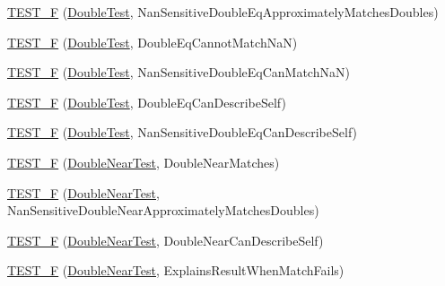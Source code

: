 \begin{DoxyCompactItemize}
\item 
\mbox{\hyperlink{namespacetesting_1_1gmock__matchers__test_ab100ee4a4b0340e31212fb43c9e28255}{T\+E\+S\+T\+\_\+F}} (\mbox{\hyperlink{namespacetesting_1_1gmock__matchers__test_a944cdd366ed240f29ae8e3ebc753ad5c}{Double\+Test}}, Nan\+Sensitive\+Double\+Eq\+Approximately\+Matches\+Doubles)
\item 
\mbox{\hyperlink{namespacetesting_1_1gmock__matchers__test_a4c34f3f339de72d3f4f96a08a5125b59}{T\+E\+S\+T\+\_\+F}} (\mbox{\hyperlink{namespacetesting_1_1gmock__matchers__test_a944cdd366ed240f29ae8e3ebc753ad5c}{Double\+Test}}, Double\+Eq\+Cannot\+Match\+NaN)
\item 
\mbox{\hyperlink{namespacetesting_1_1gmock__matchers__test_ab42c199ae0008ce7550f584742caec28}{T\+E\+S\+T\+\_\+F}} (\mbox{\hyperlink{namespacetesting_1_1gmock__matchers__test_a944cdd366ed240f29ae8e3ebc753ad5c}{Double\+Test}}, Nan\+Sensitive\+Double\+Eq\+Can\+Match\+NaN)
\item 
\mbox{\hyperlink{namespacetesting_1_1gmock__matchers__test_a5975fb5a50e5364fe21422093680a559}{T\+E\+S\+T\+\_\+F}} (\mbox{\hyperlink{namespacetesting_1_1gmock__matchers__test_a944cdd366ed240f29ae8e3ebc753ad5c}{Double\+Test}}, Double\+Eq\+Can\+Describe\+Self)
\item 
\mbox{\hyperlink{namespacetesting_1_1gmock__matchers__test_a2d101d1823617f9b1346ee64cdce5216}{T\+E\+S\+T\+\_\+F}} (\mbox{\hyperlink{namespacetesting_1_1gmock__matchers__test_a944cdd366ed240f29ae8e3ebc753ad5c}{Double\+Test}}, Nan\+Sensitive\+Double\+Eq\+Can\+Describe\+Self)
\item 
\mbox{\hyperlink{namespacetesting_1_1gmock__matchers__test_ab2949593472038919b8f3e1b2da204bc}{T\+E\+S\+T\+\_\+F}} (\mbox{\hyperlink{namespacetesting_1_1gmock__matchers__test_aea537d0183ccc65b5c49a75d711993c8}{Double\+Near\+Test}}, Double\+Near\+Matches)
\item 
\mbox{\hyperlink{namespacetesting_1_1gmock__matchers__test_add8765ad2bb98f4b064ee77b4c21a612}{T\+E\+S\+T\+\_\+F}} (\mbox{\hyperlink{namespacetesting_1_1gmock__matchers__test_aea537d0183ccc65b5c49a75d711993c8}{Double\+Near\+Test}}, Nan\+Sensitive\+Double\+Near\+Approximately\+Matches\+Doubles)
\item 
\mbox{\hyperlink{namespacetesting_1_1gmock__matchers__test_a31d14a68cacbaab3fafd26247cc11f9c}{T\+E\+S\+T\+\_\+F}} (\mbox{\hyperlink{namespacetesting_1_1gmock__matchers__test_aea537d0183ccc65b5c49a75d711993c8}{Double\+Near\+Test}}, Double\+Near\+Can\+Describe\+Self)
\item 
\mbox{\hyperlink{namespacetesting_1_1gmock__matchers__test_a4250d3de38128f3452a0a9e93173bdb4}{T\+E\+S\+T\+\_\+F}} (\mbox{\hyperlink{namespacetesting_1_1gmock__matchers__test_aea537d0183ccc65b5c49a75d711993c8}{Double\+Near\+Test}}, Explains\+Result\+When\+Match\+Fails)

\end{DoxyCompactItemize}
